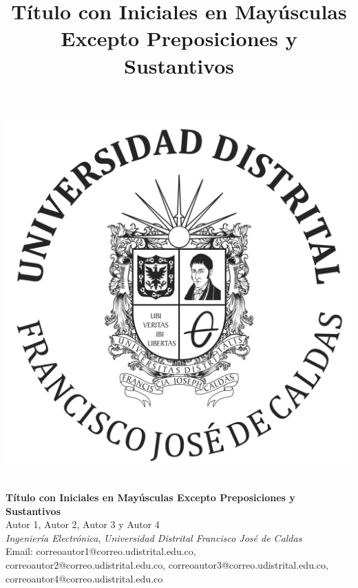\documentclass{article}
\title{Título con Iniciales en Mayúsculas Excepto Preposiciones y Sustantivos}
\author{}
\date{}
\begin{document}

\begin{center}
  \begin{minipage}{.16\linewidth}
  \qquad\qquad
    \includegraphics[width=.7\linewidth]{media/images/logo_circular_negro.png}
    ~\vfill
    ~\vfill
  \end{minipage}
  \begin{minipage}{.6\linewidth}
    \begin{center}
       \textsf{\textbf{{\fontsize{90}{108}\selectfont Título con Iniciales en Mayúsculas Excepto Preposiciones y Sustantivos}}}\\\vspace{1cm}
       \textrm{\fontsize{40}{48}\selectfont Autor 1, Autor 2, Autor 3 y Autor 4 \\\vspace{5mm} \textit{Ingeniería Electrónica}, \textit{Universidad Distrital Francisco José de Caldas}\\\vspace{5mm} Email: correoautor1@correo.udistrital.edu.co, correoautor2@correo.udistrital.edu.co, correoautor3@correo.udistrital.edu.co, correoautor4@correo.udistrital.edu.co}  
    \end{center}
  \end{minipage}
  \hspace{.03\linewidth}
    \begin{minipage}{.16\linewidth}
  \qquad\qquad

\end{minipage}
\end{center}
\end{document}
